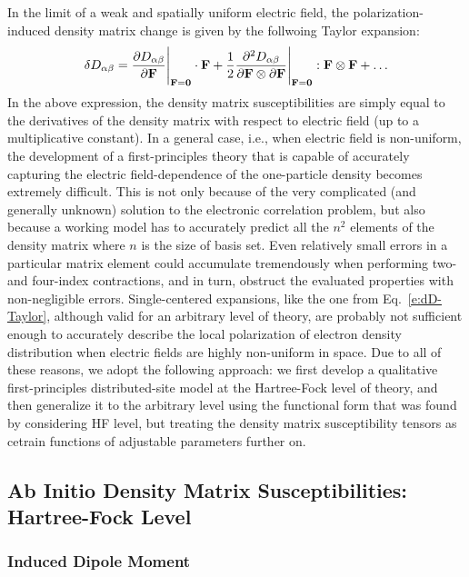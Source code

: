 \documentclass[aip,amsmath,amssymb,reprint,floatfix]{revtex4-1}
\begin{document}
In the limit of a weak and spatially uniform electric field,
the polarization\hyp{}induced density matrix change is given by the follwoing Taylor expansion:
%
\begin{equation}\label{e:dD-Taylor}
 \delta D_{\alpha\beta} = \frac{\partial D_{\alpha\beta}}{\partial {\bf F}}\Bigg|_{{\bf F}={\bf 0}}  \cdot {\bf F} 
   + \frac{1}{2} 
     \frac{\partial^2 D_{\alpha\beta}}{\partial {\bf F} \otimes \partial {\bf F}}\Bigg|_{{\bf F}={\bf 0}} : {\bf F} \otimes {\bf F}
   + \ldots 
\end{equation}
%
In the above expression, the density matrix susceptibilities are simply equal to the derivatives of the density matrix
with respect to electric field (up to a multiplicative constant).
In a general case, i.e., when electric field is non\hyp{}uniform, the development of a first\hyp{}principles theory
that is capable of accurately capturing the electric field\hyp{}dependence of the one\hyp{}particle density
becomes extremely difficult. This is not only because of the very complicated (and generally unknown) solution
to the electronic correlation problem, but also because
a working model has to accurately predict all the $n^2$ elements of the density matrix
where $n$ is the size of basis set. Even relatively small errors
in a particular matrix element could accumulate tremendously when performing two\hyp{}
and four\hyp{}index contractions,
and in turn, obstruct the evaluated properties with non\hyp{}negligible errors.
Single\hyp{}centered expansions, like the one from Eq.~\eqref{e:dD-Taylor}, although valid for 
an arbitrary level of theory,
are probably not sufficient enough to accurately describe the local polarization
of electron density distribution when electric fields are highly non\hyp{}uniform in space.
Due to all of these reasons, we adopt the following approach: 
we first develop a qualitative first\hyp{}principles distributed\hyp{}site model at the Hartree\hyp{}Fock
level of theory, and then generalize it to the arbitrary level using the functional form that was found 
by considering HF level,
but treating the density matrix susceptibility tensors as cetrain functions of adjustable parameters further on.

\subsection{Ab Initio Density Matrix Susceptibilities: Hartree-Fock Level}

\subsubsection{Induced Dipole Moment}
\end{document}
